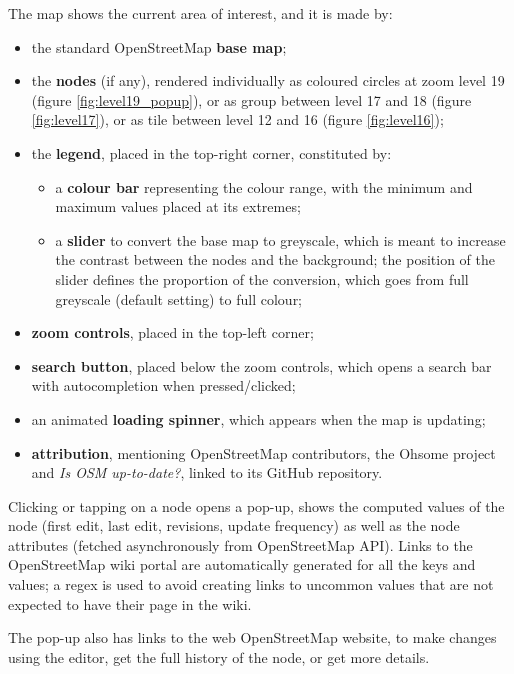 \documentclass{Configuration_Files/PoliMi3i_thesis}
\begin{document}
The map shows the current area of interest, and it is made by:
\begin{itemize}
    \item the standard OpenStreetMap \textbf{base map};
    \item the \textbf{nodes} (if any), rendered individually as coloured circles at zoom level 19 (figure \ref{fig:level19_popup}), or as group between level 17 and 18 (figure \ref{fig:level17}), or as tile between level 12 and 16 (figure \ref{fig:level16});
    \item the \textbf{legend}, placed in the top-right corner, constituted by:
    \begin{itemize}
        \item a \textbf{colour bar} representing the colour range, with the minimum and maximum values placed at its extremes;
        \item a \textbf{slider} to convert the base map to greyscale, which is meant to increase the contrast between the nodes and the background; the position of the slider defines the proportion of the conversion, which goes from full greyscale (default setting) to full colour;
    \end{itemize}
    \item \textbf{zoom controls}, placed in the top-left corner;
    \item \textbf{search button}, placed below the zoom controls, which opens a search bar with autocompletion when pressed/clicked;
    \item an animated \textbf{loading spinner}, which appears when the map is updating;
    \item \textbf{attribution}, mentioning OpenStreetMap contributors, the Ohsome project and \textit{Is OSM up-to-date?}, linked to its GitHub repository.
\end{itemize}

Clicking or tapping on a node opens a pop-up, shows the computed values of the node (first edit, last edit, revisions, update frequency) as well as the node attributes (fetched asynchronously from OpenStreetMap API). Links to the OpenStreetMap wiki portal are automatically generated for all the keys and values; a regex is used to avoid creating links to uncommon values that are not expected to have their page in the wiki.

The pop-up also has links to the web OpenStreetMap website, to make changes using the editor, get the full history of the node, or get more details.
\end{document}

